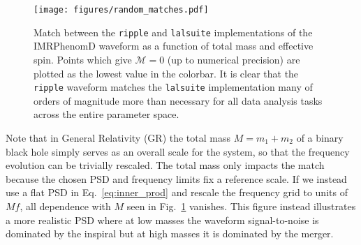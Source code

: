 \documentclass[twocolumn]{aastex631}
\newcommand{\ripple}{\texttt{ripple}\xspace}
\newcommand{\lalsuite}{\texttt{lalsuite}\xspace}
\newcommand{\te}[1]{\textbf{\color{pyGreen}(TE: #1)}}
\newcommand{\AZ}[1]{{\color{Burnt}[AZ: #1]}}
\newcommand{\mi}[1]{\textbf{\color{teal}(MI: #1)}}
\newcommand{\dfm}[1]{{\color{dfm}[DFM: #1]}}
\begin{document}
\begin{figure}[t]
    \begin{centering}
        \texttt{[image: figures/random\_matches.pdf]}
        \caption{
            Match between the \ripple and \lalsuite implementations of the IMRPhenomD waveform as a function of total mass and effective spin. 
            Points which give $\mathcal{M}=0$ (up to numerical precision) are plotted as the lowest value in the colorbar.
            It is clear that the \ripple waveform matches the \lalsuite implementation many of orders of magnitude more than necessary for all data analysis tasks across the entire parameter space.
        }
        \label{fig:match}
    \end{centering}
\end{figure}

Note that in General Relativity (GR) the total mass $M = m_1 + m_2$ of a binary black hole simply serves as an overall scale for the system, so that the frequency evolution can be trivially rescaled.
The total mass only impacts the match because the chosen PSD and frequency limits fix a reference scale.
If we instead use a flat PSD in Eq.~\ref{eq:inner_prod} and rescale the frequency grid to units of $Mf$, all dependence with $M$ seen in Fig.~\ref{fig:match} vanishes. 
This figure instead illustrates a more realistic PSD where at low masses the waveform signal-to-noise is dominated by the inspiral but at high masses it is dominated by the merger.
\end{document}

